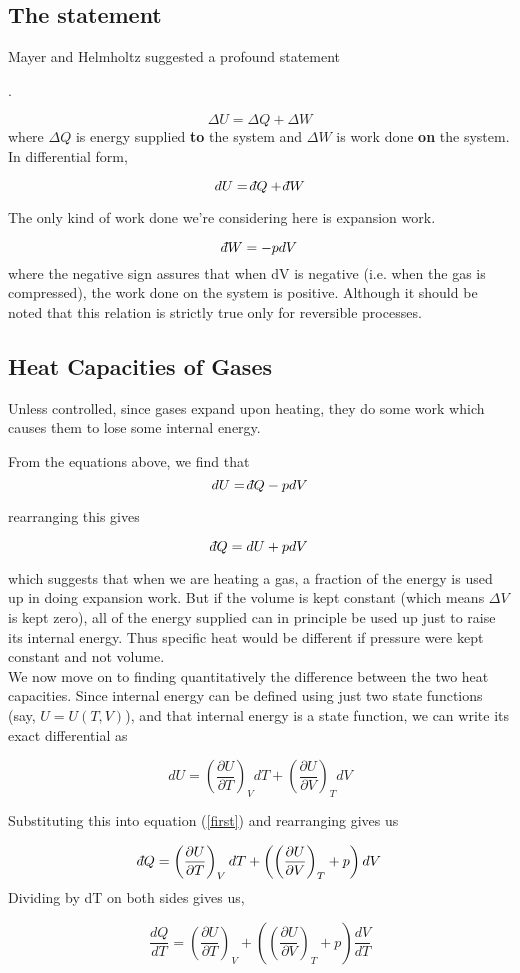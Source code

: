 \documentclass{article}
\def\dbar{{\mathchar'26\mkern-12mu d}}
\begin{document}
	\subsection{The statement}
	Mayer and Helmholtz suggested a profound statement
	\begin{center}
	.
	\end{center}
	$$ \Delta U = \Delta Q + \Delta W $$
	where $\Delta Q$ is energy supplied \textbf{to} the system and $\Delta W$ is work done \textbf{on} the system.\\
	
	In differential form,
	
	$$ dU = \dbar Q + \dbar W $$
 
 	The only kind of work done we're considering here is expansion work.
 	
 	$$ \dbar W = -pdV$$
 	where the negative sign assures that when dV is negative (i.e. when the gas is compressed), the work done on the system is positive. Although it should be noted that this relation is strictly true only for reversible processes.

	\subsection{Heat Capacities of Gases}
	Unless controlled, since gases expand upon heating, they do some work which causes them to lose some internal energy.
	
	From the equations above, we find that
	$$ dU = \dbar Q - pdV $$
	
	rearranging this gives
	
	\begin{equation}
	\label{first}
	 \dbar Q = dU + pdV
	\end{equation}

	
	which suggests that when we are heating a gas, a fraction of the energy is used up in doing expansion work. But if the volume is kept constant (which means $\Delta V$ is kept zero), all of the energy supplied can in principle be used up just to raise its internal energy. Thus specific heat would be different if pressure were kept constant and not volume. \\
	
	We now move on to finding quantitatively the difference between the two heat capacities.
	Since internal energy can be defined using just two state functions (say, $U = U(T, V)$), and that internal energy is a state function, we can write its exact differential as
	
	$$ dU = \left(\frac{\partial U}{\partial T}\right)_VdT + \left(\frac{\partial U}{\partial V}\right)_TdV $$ 
	
	Substituting this into equation (\ref{first}) and rearranging gives us
	
	$$ \dbar Q = \left(\frac{\partial U}{\partial T}\right)_V dT + \left(\left(\frac{\partial U}{\partial V}\right)_T + p\right)dV $$
	Dividing by dT on both sides gives us,
	
	$$ \frac{dQ}{dT} = \left(\frac{\partial U}{\partial T}\right)_V + \left(\left(\frac{\partial U}{\partial V}\right)_T + p\right)\frac{dV}{dT}$$
\end{document}
